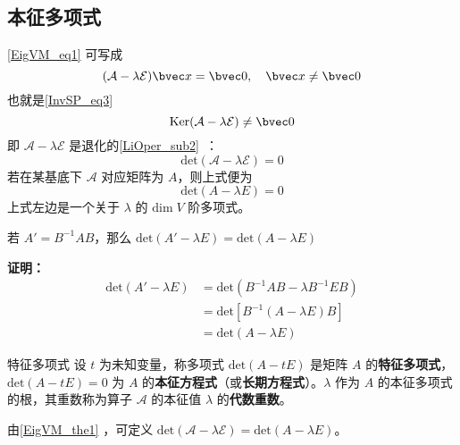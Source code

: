 \subsection{本征多项式}
\autoref{EigVM_eq1} 可写成
\begin{equation}
(\mathcal{A-\lambda E})\bvec x=\bvec 0,\quad \bvec x\neq\bvec 0
\end{equation}
也就是\autoref{InvSP_eq3}~ 
\begin{equation}
\mathrm{Ker(\mathcal{A}-\lambda\mathcal{E})}\neq\bvec 0
\end{equation}
即 $\mathcal{A-\lambda E}$ 是退化的\autoref{LiOper_sub2}~：
\begin{equation}
\mathrm{det}(\mathcal{A-\lambda E})=0
\end{equation}
若在某基底下 $\mathcal{A}$ 对应矩阵为 $A$，则上式便为
\begin{equation}\label{EigVM_eq2}
\mathrm{det}(A-\lambda E)=0
\end{equation}
上式左边是一个关于 $\lambda$ 的 $\mathrm{dim}\;{V}$ 阶多项式。
\begin{theorem}{}\label{EigVM_the1}
若 $A'=B^{-1}AB$，那么 $\mathrm{det}(A'-\lambda E)=\mathrm{det}(A-\lambda E)$
\end{theorem}
\textbf{证明：}
\begin{equation}
\begin{aligned}
\mathrm{det}(A'-\lambda E)&=\mathrm{det}(B^{-1}AB-\lambda B^{-1}EB)\\
&=\mathrm{det}[B^{-1}(A-\lambda E)B]\\
&=\mathrm{det}(A-\lambda E)
\end{aligned}
\end{equation}
\begin{definition}{特征多项式}
设 $t$ 为未知变量，称多项式 $\mathrm{det}(A-tE)$ 是矩阵 $A$ 的\textbf{特征多项式}，$\mathrm{det}(A-tE)=0$ 为 $A$ 的\textbf{本征方程式}（或\textbf{长期方程式}）。$\lambda$ 作为 $A$ 的本征多项式的根，其重数称为算子 $\mathcal{A}$ 的本征值 $\lambda$ 的\textbf{代数重数}。
\end{definition}
由\autoref{EigVM_the1} ，可定义 $\mathrm{det}(\mathcal{A-\lambda E})=\mathrm{det}(A-\lambda E)$。
